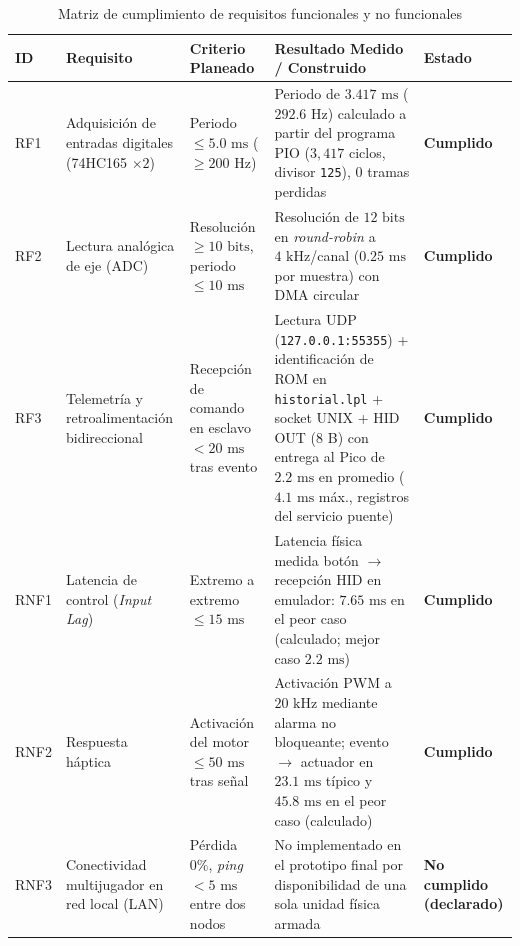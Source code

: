 \documentclass[conference]{IEEEtran}
\begin{document}
\begin{table}[!t]
	\centering
	\caption{Matriz de cumplimiento de requisitos funcionales y no funcionales}
	\label{tab:requisitos}
	\footnotesize
	\begin{tabular}{|p{1.0cm}|p{3.4cm}|p{3.3cm}|p{3.8cm}|p{2.2cm}|}
		\hline
		\textbf{ID} & \textbf{Requisito} & \textbf{Criterio Planeado} & \textbf{Resultado Medido / Construido} & \textbf{Estado} \\
		\hline
		RF1 & Adquisición de entradas digitales (74HC165 $\times 2$) & Periodo $\le 5.0\text{ ms}$ ($\ge 200\text{ Hz}$) & Periodo de $3.417\text{ ms}$ ($292.6\text{ Hz}$) calculado a partir del programa PIO ($3{,}417$ ciclos, divisor \texttt{125}), $0$ tramas perdidas & \textbf{Cumplido} \\
		\hline
		RF2 & Lectura analógica de eje (ADC) & Resolución $\ge 10\text{ bits}$, periodo $\le 10\text{ ms}$ & Resolución de $12\text{ bits}$ en \textit{round-robin} a $4\text{ kHz}$/canal ($0.25\text{ ms}$ por muestra) con DMA circular & \textbf{Cumplido} \\
		\hline
		RF3 & Telemetría y retroalimentación bidireccional & Recepción de comando en esclavo $< 20\text{ ms}$ tras evento & Lectura UDP (\texttt{127.0.0.1:55355}) + identificación de ROM en \texttt{historial.lpl} + socket UNIX + HID OUT (8 B) con entrega al Pico de $2.2\text{ ms}$ en promedio ($4.1\text{ ms}$ máx., registros del servicio puente) & \textbf{Cumplido} \\
		\hline
		RNF1 & Latencia de control (\textit{Input Lag}) & Extremo a extremo $\le 15\text{ ms}$ & Latencia física medida botón $\rightarrow$ recepción HID en emulador: $7.65\text{ ms}$ en el peor caso (calculado; mejor caso $2.2\text{ ms}$) & \textbf{Cumplido} \\
		\hline
		RNF2 & Respuesta háptica & Activación del motor $\le 50\text{ ms}$ tras señal & Activación PWM a $20\text{ kHz}$ mediante alarma no bloqueante; evento $\rightarrow$ actuador en $23.1\text{ ms}$ típico y $45.8\text{ ms}$ en el peor caso (calculado) & \textbf{Cumplido} \\
		\hline
		RNF3 & Conectividad multijugador en red local (LAN) & Pérdida $0\%$, \textit{ping} $< 5\text{ ms}$ entre dos nodos & No implementado en el prototipo final por disponibilidad de una sola unidad física armada & \textbf{No cumplido (declarado)} \\
		\hline
	\end{tabular}
\end{table}
\end{document}
